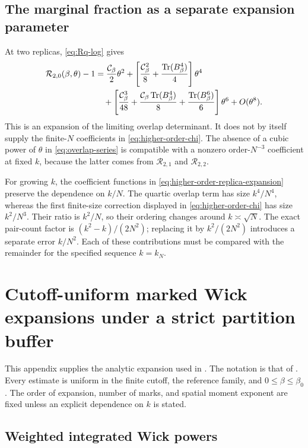 \documentclass[11pt,reqno]{amsart}
\numberwithin{equation}{section}
\theoremstyle{plain}
\theoremstyle{definition}
\newcommand{\Tr}{\operatorname{Tr}}
\newcommand{\be}{\beta}
\begin{document}
\subsection{The marginal fraction as a separate expansion parameter}

At two replicas, \eqref{eq:Rq-log} gives
\begin{align}\label{eq:overlap-series}
 \mathcal R_{2,0}(\be,\theta)-1
 &=\frac{\mathcal C_\be}{2}\theta^2
 +\left[\frac{\mathcal C_\be^2}{8}+\frac{\Tr(B_\be^4)}4\right]\theta^4\notag\\
 &\quad+\left[\frac{\mathcal C_\be^3}{48}
             +\frac{\mathcal C_\be\Tr(B_\be^4)}8
             +\frac{\Tr(B_\be^6)}6\right]\theta^6
 +O(\theta^8).
\end{align}
This is an expansion of the limiting overlap determinant. It does not by itself supply the finite-$N$ coefficients in \eqref{eq:higher-order-chi}. The absence of a cubic power of $\theta$ in \eqref{eq:overlap-series} is compatible with a nonzero order-$N^{-3}$ coefficient at fixed $k$, because the latter comes from $\mathcal R_{2,1}$ and $\mathcal R_{2,2}$.

For growing $k$, the coefficient functions in \eqref{eq:higher-order-replica-expansion} preserve the dependence on $k/N$. The quartic overlap term has size $k^4/N^4$, whereas the first finite-size correction displayed in \eqref{eq:higher-order-chi} has size $k^2/N^3$. Their ratio is $k^2/N$, so their ordering changes around $k\asymp\sqrt N$. The exact pair-count factor is $(k^2-k)/(2N^2)$; replacing it by $k^2/(2N^2)$ introduces a separate error $k/N^2$. Each of these contributions must be compared with the remainder for the specified sequence $k=k_N$.

\section{Cutoff-uniform marked Wick expansions under a strict partition buffer}
\label{app:prescribed-marked-technical}

This appendix supplies the analytic expansion used in .  The notation is that of .  Every estimate is uniform in the finite cutoff, the reference family, and $0\leq\be\leq\be_0$.  The order of expansion, number of marks, and spatial moment exponent are fixed unless an explicit dependence on $k$ is stated.

\subsection{Weighted integrated Wick powers}
\end{document}
